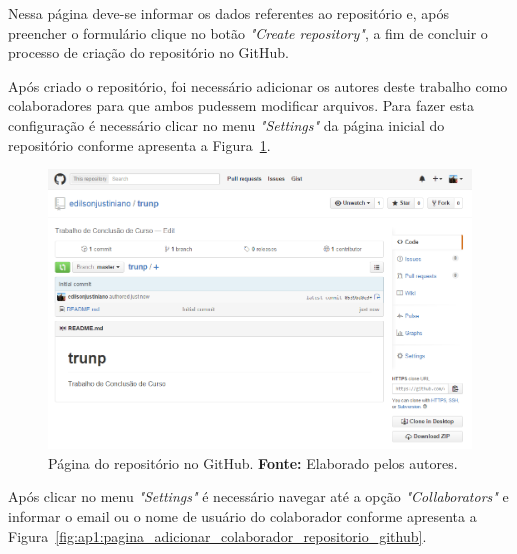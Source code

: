Nessa página deve-se informar os dados referentes ao repositório e, após preencher o formulário clique no botão \textit{"Create repository"}, a fim de concluir o processo de criação do repositório no GitHub.

Após criado o repositório, foi necessário adicionar os autores deste trabalho como colaboradores para que ambos pudessem modificar arquivos. Para fazer esta configuração é necessário clicar no menu \textit{"Settings"} da página inicial do repositório conforme apresenta a Figura~\ref{fig:ap1:pagina_inicial_repositororio_github}.

\newpage
\captionsetup[figure]{list=no}
\begin{figure}[h!]
	\centerline{\includegraphics[scale=0.5]{./imagens/apendices/pagina-inicial-repositorio-github.png}}
	\caption[Página do repositório no GitHub.]
	{Página do repositório no GitHub. \textbf{Fonte:} Elaborado pelos autores.}
	\label{fig:ap1:pagina_inicial_repositororio_github}
\end{figure}

Após clicar no menu \textit{"Settings"} é necessário navegar até a opção \textit{"Collaborators"} e informar o email ou o nome de usuário do colaborador conforme apresenta a Figura~\ref{fig:ap1:pagina_adicionar_colaborador_repositorio_github}.

